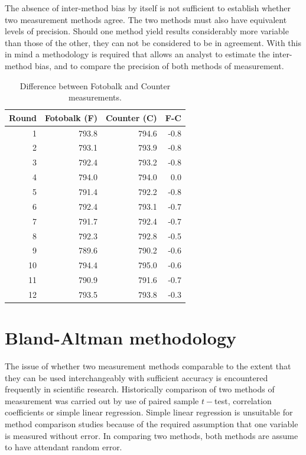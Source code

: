 \documentclass[12pt, a4paper]{report}
\theoremstyle{plain}
\theoremstyle{definition}
\theoremstyle{remark}
\begin{document}
The absence of inter-method bias by itself is not sufficient to
establish whether two measurement methods agree. The two methods
must also have equivalent levels of precision. Should one method
yield results considerably more variable than those of the other,
they can not be considered to be in agreement. With this in mind a
methodology is required that allows an analyst to estimate the
inter-method bias, and to compare the precision of both methods of
measurement.
\newpage
\begin{table}[h!]

\begin{center}

\begin{tabular}{rrrr}
  \hline
 Round& Fotobalk (F) & Counter (C) & F-C \\
  \hline
1 & 793.8& 794.6 & -0.8 \\
  2 & 793.1 & 793.9 & -0.8 \\
  3 & 792.4 & 793.2 & -0.8 \\
  4 & 794.0 & 794.0 & 0.0 \\
  5 & 791.4 & 792.2 & -0.8 \\
  6 & 792.4 & 793.1 & -0.7 \\
  7 & 791.7 & 792.4 & -0.7 \\
  8 & 792.3 & 792.8 & -0.5 \\
  9 & 789.6 & 790.2 & -0.6 \\
  10 & 794.4 & 795.0 & -0.6 \\
  11 & 790.9 & 791.6 & -0.7 \\
  12 & 793.5 & 793.8 & -0.3 \\
   \hline
\end{tabular}
\caption{Difference between Fotobalk and Counter measurements.}
\end{center}
\end{table}

\bigskip

\newpage

\section{Bland-Altman methodology}
The issue of whether two measurement methods comparable to the
extent that they can be used interchangeably with sufficient
accuracy is encountered frequently in scientific research.
Historically comparison of two methods of measurement was carried
out by use of paired sample $t-$test, correlation coefficients or
simple linear regression. Simple linear regression is unsuitable for method comparison studies because of the required assumption that one variable is measured without error. In comparing two methods, both methods are assume to have attendant random error.
\end{document}
